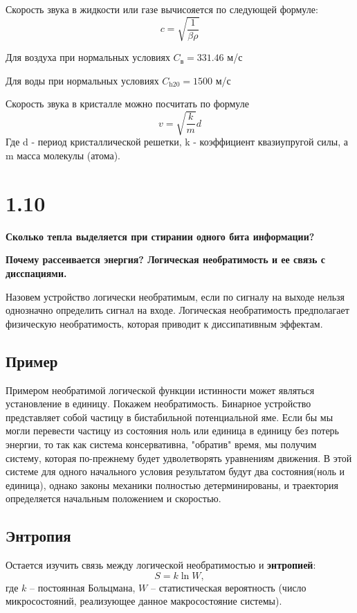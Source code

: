 \documentclass[a4paper,14pt]{article}
\begin{document}
Скорость звука в жидкости или газе вычисояется по следующей формуле:
$$c = \sqrt{\frac{1}{\beta \rho}}$$

Для воздуха при нормальных условиях
$C_{\text{в}} = 331.46$ м/с

Для воды при нормальных условиях
$C_{\text{h20}} = 1500$ м/с

Скорость звука в кристалле можно посчитать по формуле 
$$v=\sqrt{\frac{k}{m}}d$$
Где d - период кристаллической решетки, k - коэффициент квазиупругой силы, а m масса молекулы (атома).

\section*{1.10}

\begin{center}
	\LARGE{\textbf{Сколько тепла выделяется при стирании одного бита информации?}}\\
\end{center}

\textbf{Почему рассеивается энергия? Логическая необратимость и ее связь с дисспациями.}
 
Назовем устройство логически необратимым, если по сигналу на выходе нельзя однозначно определить сигнал на входе. Логическая необратимость предполагает физическую необратимость, которая приводит к диссипативным эффектам.

\subsection*{Пример}
Примером необратимой логической функции истинности может являться установление в единицу.
Покажем необратимость. Бинарное устройство представляет собой частицу в бистабильной потенциальной яме. Если бы мы могли перевести частицу из состояния ноль или единица в единицу без потерь энергии, то так как система консервативна, "обратив" время, мы получим систему, которая по-прежнему будет удволетворять уравнениям движения. В этой системе для одного начального условия результатом будут два состояния(ноль и единица), однако законы механики полностью детерминированы, и траектория определяется начальным положением и скоростью.

\subsection*{Энтропия}

Остается изучить связь между логической необратимостью и \textbf{энтропией}:
\begin{equation}
	S = k \ln W,
\end{equation}
где $k$ -- постоянная Больцмана, $W$ -- статистическая вероятность (число микросостояний, реализующее данное макросостояние системы).
\end{document}
